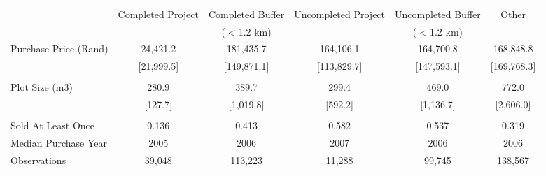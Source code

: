 \begin{tabu}{lccccc}
\toprule
 & Completed Project       & Completed Buffer       & Uncompleted Project       & Uncompleted Buffer       & Other      \\
 &        & ($<$1.2 km)       &        & ($<$1.2 km)       &      \\
\midrule
 Purchase Price (Rand)  & 24,421.2  & 181,435.7  & 164,106.1  & 164,700.8  & 168,848.8  \\ 
\rowfont{\footnotesize} & [21,999.5]  & [149,871.1]  & [113,829.7]  & [147,593.1]  & [169,768.3]  \\ 
 &  &  &  &  &  \\ 
 Plot Size (m3)  & 280.9  & 389.7  & 299.4  & 469.0  & 772.0  \\ 
\rowfont{\footnotesize} & [127.7]  & [1,019.8]  & [592.2]  & [1,136.7]  & [2,606.0]  \\ 
 &  &  &  &  &  \\ 
 Sold At Least Once  & 0.136  & 0.413  & 0.582  & 0.537  & 0.319  \\ 
 Median Purchase Year  & 2005  & 2006  & 2007  & 2006  & 2006  \\ 
\midrule
 Observations  & 39,048  & 113,223  & 11,288  & 99,745  & 138,567  \\ 
\bottomrule
\end{tabu}
